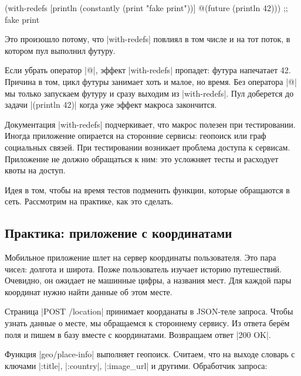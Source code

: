 
\begin{english}
  \begin{clojure}
(with-redefs
  [println (constantly (print "fake print"))]
  @(future (println 42)))
;; fake print
  \end{clojure}
\end{english}

Это произошло потому, что \spverb|with-redefs| повлиял в том числе и на тот
поток, в котором пул выполнил футуру.

Если убрать оператор \spverb|@|, эффект \spverb|with-redefs| пропадет: футура
напечатает 42. Причина в том, цикл футуры занимает хоть и малое, но время. Без
оператора \spverb|@| мы только запускаем футуру и сразу выходим из
\spverb|with-redefs|. Пул доберется до задачи \spverb|(println 42)| когда уже
эффект макроса закончится.

Документация \spverb|with-redefs| подчеркивает, что макрос полезен при
тестировании. Иногда приложение опирается на сторонние сервисы: геопоиск или
граф социальных связей. При тестировании возникает проблема доступа к
сервисам. Приложение не должно обращаться к ним: это усложняет тесты и расходует
квоты на доступ.

Идея в том, чтобы на время тестов подменить функции, которые обращаются в
сеть. Рассмотрим на практике, как это сделать.

\subsection{Практика: приложение с координатами}


Мобильное приложение шлет на сервер координаты пользователя. Это пара чисел:
долгота и широта. Позже пользователь изучает историю путешествий. Очевидно, он
ожидает не машинные цифры, а названия мест. Для каждой пары координат нужно
найти данные об этом месте.

Страница \spverb|POST /location| принимает коорданаты в JSON-теле запроса. Чтобы
узнать данные о месте, мы обращаемся к стороннему сервису. Из ответа бер\"{е}м
поля и пишем в базу вместе с координатами. Возвращаем ответ \spverb|200 OK|.

Функция \spverb|geo/place-info| выполняет геопоиск. Считаем, что на выходе
словарь с ключами \spverb|:title|, \spverb|:country|, \spverb|:image_url| и
другими. Обработчик запроса:

